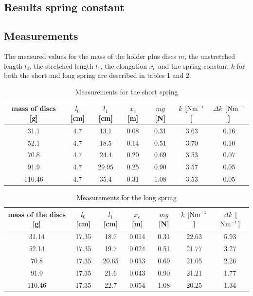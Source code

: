 \documentclass[a4paper, 10pt]{article}
\newcommand{\inv}{^{\raisebox{.2ex}{$\scriptscriptstyle-1$}}}
\begin{document}
\begin{flushleft}
\section{Results spring constant}
\subsection{Measurements}
The measured values for the mass of the holder plus discs $m$, the unstretched
length $l_0$, the stretched length $l_1$, the elongation $x_e$ and the spring
constant $k$ for both the short and long spring are described in tables 1 and 2.
\begin{table}[!h]
    \centering
    \caption{Measurements for the short spring}
    \label{tab:1}
    \begin{tabular}{|c|c|c|c|c|c|c|} 
    \hline
    mass of discs [g] & $l_0$ [cm] & $l_1$ [cm] & $x_e$ [m] &
    $mg$ [N]  & $k$ [$\mathrm{Nm\inv}$] & $\Delta k$ [$\mathrm{Nm\inv}$]  \\ 
    \hline
    31.1                              & 4.7     & 13.1    & 0.08   & 0.31 & 3.63     & 0.16    \\ 
    \hline
    52.1                              & 4.7     & 18.5    & 0.14   & 0.51 & 3.70     & 0.10    \\ 
    \hline
    70.8                               & 4.7     & 24.4    & 0.20   & 0.69 & 3.53     & 0.07    \\ 
    \hline
    91.9                               & 4.7     & 29.95   & 0.25  & 0.90 & 3.57     & 0.05   \\ 
    \hline
    110.46                             & 4.7     & 35.4    & 0.31   & 1.08 & 3.53     & 0.05     \\
    \hline
    \end{tabular}
\end{table}
\begin{table}[!h]
    \centering
    \caption{Measurements for the long spring}
    \begin{tabular}{|c|c|c|c|c|c|c|} 
    \hline
    mass of the discs [g] & $l_0$ [cm] & $l_1$ [cm] & $x_e$ [m] & $mg$ [N]  &
    $k$ [$\mathrm{Nm\inv}$] & $\Delta k$ [$\mathrm{Nm     \inv}$]        \\ 
    \hline
    31.14                 & 17.35   & 18.7    & 0.014 & 0.31 & 22.63      & 5.93  \\ 
    \hline
    52.14                 & 17.35   & 19.7    & 0.024 & 0.51 & 21.77     & 3.27 \\ 
    \hline
    70.8                  & 17.35   & 20.65   & 0.033  & 0.69 & 21.05     & 2.26  \\ 
    \hline
    91.9                  & 17.35   & 21.6    & 0.043 & 0.90 & 21.21     & 1.77  \\ 
    \hline
    110.46                & 17.35   & 22.7    & 0.054 & 1.08 & 20.25     & 1.34  \\
    \hline
    \end{tabular}
\end{table}
\newpage

\end{flushleft}
\end{document}
